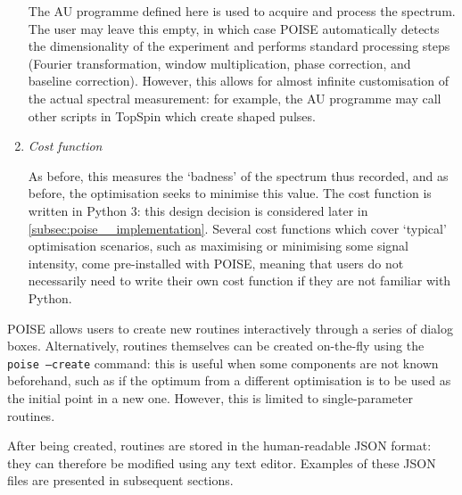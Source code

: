 \begin{enumerate}
        The AU programme defined here is used to acquire and process the spectrum.
        The user may leave this empty, in which case POISE automatically detects the dimensionality of the experiment and performs standard processing steps (Fourier transformation, window multiplication, phase correction, and baseline correction).
        However, this allows for almost infinite customisation of the actual spectral measurement: for example, the AU programme may call other scripts in TopSpin which create shaped pulses.

    \item \textit{Cost function}

        As before, this measures the `badness' of the spectrum thus recorded, and as before, the optimisation seeks to minimise this value.
        The cost function is written in Python 3: this design decision is considered later in \cref{subsec:poise__implementation}.
        Several cost functions which cover `typical' optimisation scenarios, such as maximising or minimising some signal intensity, come pre-installed with POISE, meaning that users do not necessarily need to write their own cost function if they are not familiar with Python.
\end{enumerate}

POISE allows users to create new routines interactively through a series of dialog boxes.
Alternatively, routines themselves can be created on-the-fly using the \texttt{poise --create} command: this is useful when some components are not known beforehand, such as if the optimum from a different optimisation is to be used as the initial point in a new one.
However, this is limited to single-parameter routines.

After being created, routines are stored in the human-readable JSON format: they can therefore be modified using any text editor.
Examples of these JSON files are presented in subsequent sections.
